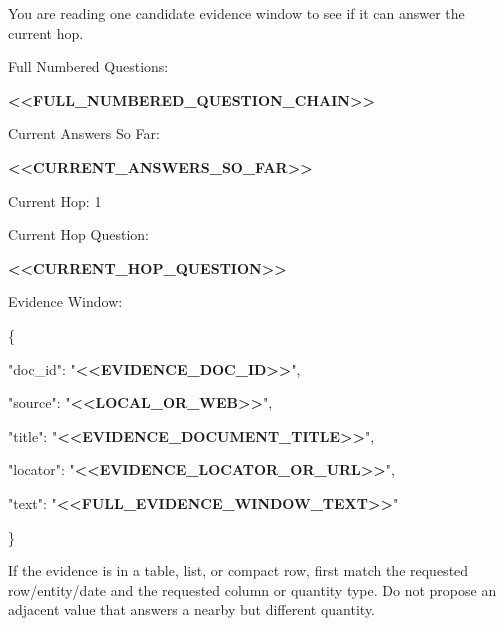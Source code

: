 \begin{tcolorbox}[colback=white, colframe=my-green, coltitle=black, parskip=5mm, title=\textbf{Document Read with Sample Output}, halign=flush left, enhanced, breakable, skin first=enhanced, skin middle=enhanced, skin last=enhanced]
\begin{scriptsize}
\ttfamily
\setlength{\parindent}{0pt}
You are reading one candidate evidence window to see if it can answer the current hop.\par
\mbox{}\par
Full Numbered Questions:\par
\textcolor{my-green}{\textbf{\textless{}\textless{}FULL\_NUMBERED\_QUESTION\_CHAIN\textgreater{}\textgreater{}}}\par
\mbox{}\par
Current Answers So Far:\par
\textcolor{my-green}{\textbf{\textless{}\textless{}CURRENT\_ANSWERS\_SO\_FAR\textgreater{}\textgreater{}}}\par
\mbox{}\par
Current Hop: 1\par
Current Hop Question:\par
\textcolor{my-green}{\textbf{\textless{}\textless{}CURRENT\_HOP\_QUESTION\textgreater{}\textgreater{}}}\par
\mbox{}\par
Evidence Window:\par
\{\par
  "doc\_id": "\textcolor{my-green}{\textbf{\textless{}\textless{}EVIDENCE\_DOC\_ID\textgreater{}\textgreater{}}}",\par
  "source": "\textcolor{my-green}{\textbf{\textless{}\textless{}LOCAL\_OR\_WEB\textgreater{}\textgreater{}}}",\par
  "title": "\textcolor{my-green}{\textbf{\textless{}\textless{}EVIDENCE\_DOCUMENT\_TITLE\textgreater{}\textgreater{}}}",\par
  "locator": "\textcolor{my-green}{\textbf{\textless{}\textless{}EVIDENCE\_LOCATOR\_OR\_URL\textgreater{}\textgreater{}}}",\par
  "text": "\textcolor{my-green}{\textbf{\textless{}\textless{}FULL\_EVIDENCE\_WINDOW\_TEXT\textgreater{}\textgreater{}}}"\par
\}\par
\mbox{}\par
If the evidence is in a table, list, or compact row, first match the requested row/entity/date and the requested column or quantity type. Do not propose an adjacent value that answers a nearby but different quantity.\par

\end{scriptsize}
\end{tcolorbox}
